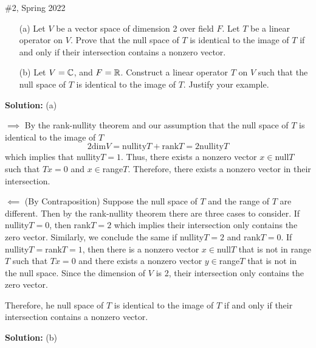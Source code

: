 \documentclass{article}
\begin{document}
\begin{problem}{\#2, Spring 2022}\;
	\begin{enumerate}
		\item[(a)] Let $V$ be a vector space of dimension 2 over field $F$. Let $T$ be a linear operator on $V$. Prove that the null space of $T$ is identical
				to the image of $T$ if and only if their intersection contains a nonzero vector. 
		\item[(b)] Let $V = \mathbb C$, and $F = \mathbb R$. Construct a linear operator $T$ on $V$ such that the null space of $T$ is identical to the image of $T$.
				Justify your example.
	\end{enumerate}
\end{problem}


\textbf{Solution:} (a)

	$\implies$ By the rank-nullity theorem and our assumption that the null space of $T$ is identical to the image of $T$ 
		\[ 2 \text{dim} V = \text{nullity} T + \text{rank} T = 2 \text{nullity} T\]
		which implies that nullity$T = 1$. Thus, there exists a nonzero vector $x\in$null$T$ such that $Tx = 0$ and $x\in$range$T$. Therefore, there exists
		a nonzero vector in their intersection.
		
	$\impliedby$ (By Contraposition) Suppose the null space of $T$ and the range of $T$ are different. Then by the rank-nullity theorem there are three cases
		to consider. If nullity$T = 0$, then rank$T = 2$ which implies their intersection only contains the zero vector. Similarly, we conclude the same if 
		nullity$T = 2$ and rank$T = 0$. If nullity$T =$rank$T = 1$, then there is a nonzero vector $x\in $null$T$ that is not in range$T$ such that $Tx=0$ and 
		there exists a nonzero vector $y\in$range$T$ that is not in the null space. Since the dimension of $V$ is 2, their intersection only contains the zero
		vector. 
		
	Therefore, he null space of $T$ is identical to the image of $T$ if and only if their intersection contains a nonzero vector. 
	
\textbf{Solution:} (b) 
\end{document}
